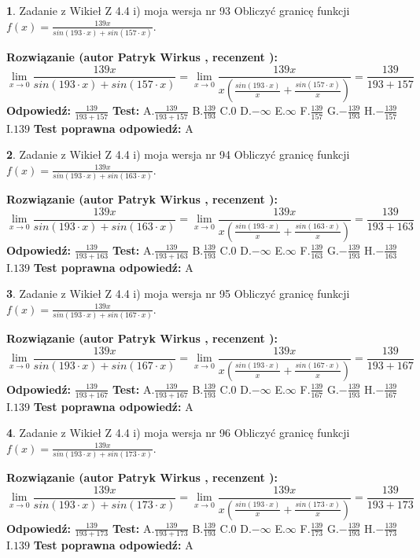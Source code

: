 \documentclass[12pt, a4paper]{article}
\theoremstyle{definition} %
\newtheorem{zad}{}
\newcommand{\zadStart}[1]{\begin{zad}#1\newline}
\newcommand{\zadStop}{\end{zad}}
\newcommand{\rozwStart}[2]{\noindent \textbf{Rozwiązanie (autor #1 , recenzent #2): }\newline}
\newcommand{\rozwStop}{\newline}
\newcommand{\odpStart}{\noindent \textbf{Odpowiedź:}\newline}
\newcommand{\odpStop}{\newline}
\newcommand{\testStart}{\noindent \textbf{Test:}\newline}
\newcommand{\testStop}{\newline}
\newcommand{\kluczStart}{\noindent \textbf{Test poprawna odpowiedź:}\newline}
\newcommand{\kluczStop}{\newline}
\begin{document}
\zadStart{Zadanie z Wikieł Z 4.4 i) moja wersja nr 93}
Obliczyć granicę funkcji $f(x)=\frac{139x}{sin(193\cdot x) +sin(157\cdot x)}$.
\zadStop
\rozwStart{Patryk Wirkus}{}
$$\lim\limits_{x\to 0}\frac{139x}{sin(193\cdot x) +sin(157\cdot x)}=\lim\limits_{x\to 0}\frac{139x}{x(\frac{sin(193\cdot x)}{x}+\frac{sin(157\cdot x)}{x})}=\frac{139}{193+157}$$
\rozwStop
\odpStart
$\frac{139}{193+157}$
\odpStop
\testStart
A.$\frac{139}{193+157}$
B.$\frac{139}{193}$
C.$0$
D.$-\infty$
E.$\infty$
F.$\frac{139}{157}$
G.$-\frac{139}{193}$
H.$-\frac{139}{157}$
I.$139$
\testStop
\kluczStart
A
\kluczStop



\zadStart{Zadanie z Wikieł Z 4.4 i) moja wersja nr 94}
Obliczyć granicę funkcji $f(x)=\frac{139x}{sin(193\cdot x) +sin(163\cdot x)}$.
\zadStop
\rozwStart{Patryk Wirkus}{}
$$\lim\limits_{x\to 0}\frac{139x}{sin(193\cdot x) +sin(163\cdot x)}=\lim\limits_{x\to 0}\frac{139x}{x(\frac{sin(193\cdot x)}{x}+\frac{sin(163\cdot x)}{x})}=\frac{139}{193+163}$$
\rozwStop
\odpStart
$\frac{139}{193+163}$
\odpStop
\testStart
A.$\frac{139}{193+163}$
B.$\frac{139}{193}$
C.$0$
D.$-\infty$
E.$\infty$
F.$\frac{139}{163}$
G.$-\frac{139}{193}$
H.$-\frac{139}{163}$
I.$139$
\testStop
\kluczStart
A
\kluczStop



\zadStart{Zadanie z Wikieł Z 4.4 i) moja wersja nr 95}
Obliczyć granicę funkcji $f(x)=\frac{139x}{sin(193\cdot x) +sin(167\cdot x)}$.
\zadStop
\rozwStart{Patryk Wirkus}{}
$$\lim\limits_{x\to 0}\frac{139x}{sin(193\cdot x) +sin(167\cdot x)}=\lim\limits_{x\to 0}\frac{139x}{x(\frac{sin(193\cdot x)}{x}+\frac{sin(167\cdot x)}{x})}=\frac{139}{193+167}$$
\rozwStop
\odpStart
$\frac{139}{193+167}$
\odpStop
\testStart
A.$\frac{139}{193+167}$
B.$\frac{139}{193}$
C.$0$
D.$-\infty$
E.$\infty$
F.$\frac{139}{167}$
G.$-\frac{139}{193}$
H.$-\frac{139}{167}$
I.$139$
\testStop
\kluczStart
A
\kluczStop



\zadStart{Zadanie z Wikieł Z 4.4 i) moja wersja nr 96}
Obliczyć granicę funkcji $f(x)=\frac{139x}{sin(193\cdot x) +sin(173\cdot x)}$.
\zadStop
\rozwStart{Patryk Wirkus}{}
$$\lim\limits_{x\to 0}\frac{139x}{sin(193\cdot x) +sin(173\cdot x)}=\lim\limits_{x\to 0}\frac{139x}{x(\frac{sin(193\cdot x)}{x}+\frac{sin(173\cdot x)}{x})}=\frac{139}{193+173}$$
\rozwStop
\odpStart
$\frac{139}{193+173}$
\odpStop
\testStart
A.$\frac{139}{193+173}$
B.$\frac{139}{193}$
C.$0$
D.$-\infty$
E.$\infty$
F.$\frac{139}{173}$
G.$-\frac{139}{193}$
H.$-\frac{139}{173}$
I.$139$
\testStop
\kluczStart
A
\kluczStop
\end{document}
